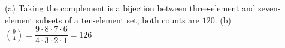 (a) Taking the complement is a bijection between three-element and seven-element subsets of a ten-element set; both counts are $120$. (b) $\binom94=\dfrac{9\cdot8\cdot7\cdot6}{4\cdot3\cdot2\cdot1}=\boxed{126}$.
